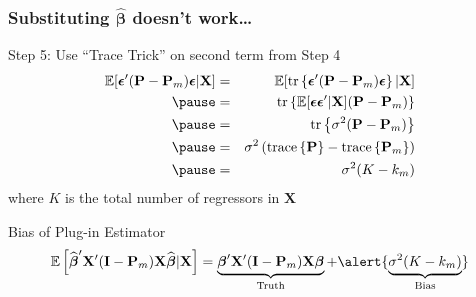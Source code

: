 \begin{frame}
\frametitle{Substituting $\widehat{\boldsymbol{\beta}}$ doesn't work\dots}

\begin{block}{Step 5: Use ``Trace Trick'' on second term from Step 4}
  \vspace{-1.5em} 
    \begin{eqnarray*}
      \mathbb{E}[\boldsymbol{\epsilon}'(\mathbf{P} - \mathbf{P}_m)\boldsymbol{\epsilon}|\mathbf{X}]&=&\mathbb{E}[\mbox{tr}\left\{\boldsymbol{\epsilon}'(\mathbf{P} - \mathbf{P}_m)\boldsymbol{\epsilon}\right\}|\mathbf{X}]\\ \pause
      &=&  \mbox{tr}\left\{\mathbb{E}[\boldsymbol{\boldsymbol{\epsilon}\epsilon}'|\mathbf{X}](\mathbf{P} - \mathbf{P}_m)\right\}\\ \pause
      &=&\mbox{tr}\left\{\sigma^2(\mathbf{P} - \mathbf{P}_m)\right\}\\ \pause
      &=& \sigma^2 \left(\mbox{trace}\left\{\mathbf{P}\right\} - \mbox{trace}\left\{\mathbf{P}_m\right\}\right)\\  \pause
			&=& \sigma^2 (K - k_m) 
      \end{eqnarray*}
      where $K$ is the total number of regressors in $\mathbf{X}$
\end{block}

\pause

\begin{block}{Bias of Plug-in Estimator}
  \vspace{-1.5em}
  \[
    \mathbb{E}\left[ \widehat{\boldsymbol{\beta}}'\mathbf{X}'(\mathbf{I} - \mathbf{P}_m) \mathbf{X}\widehat{\boldsymbol{\beta}}|\mathbf{X}\right] = \underbrace{\boldsymbol{\beta}' \mathbf{X}' (\mathbf{I} - \mathbf{P}_m)\mathbf{X} \boldsymbol{\beta}}_{\text{Truth}} +
    \alert{\underbrace{\sigma^2(K - k_m)}_{\text{Bias}}}
   \]
\end{block}

\end{frame}
